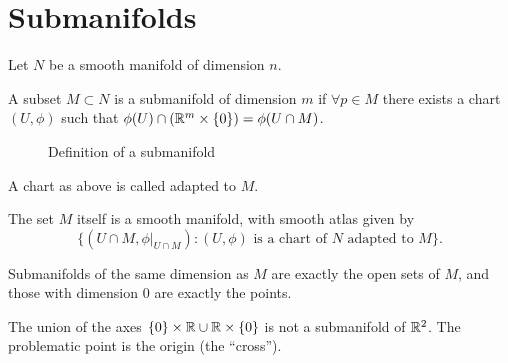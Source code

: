 \section{Submanifolds}

Let $N$ be a smooth manifold of dimension $n$.
\begin{definition}[Submanifold]
    A subset $M \subset N$ is a submanifold of dimension $m$ if $\forall p \in M$ there exists a chart $(U,\phi)$ such that $\phi(U) \cap \left( \mathbb{R}^m  \times \{0\} \right)  = \phi(U \cap M)$.
\end{definition}

\begin{figure}[ht]
    \centering
    \caption{Definition of a submanifold}
    \label{fig:submanifold}
\end{figure}
\begin{remark}
    A chart as above is called adapted to $M$.
\end{remark}
\begin{remark}
    The set $M$ itself is a smooth manifold, with smooth atlas given by     \[
        \{(U \cap M, \phi|_{U \cap M}) : (U, \phi) \text{ is a chart of $N$ adapted to $M$}\} 
    .\] 
\end{remark}
\begin{remark}
   Submanifolds of the same dimension as $M$ are exactly the open sets of $M$, and those with dimension $0$ are exactly the points.
\end{remark}
\begin{eg}
 The union of the axes   $\{0\} \times \mathbb{R} \cup \mathbb{R}\times \{0\}$ is not a submanifold of $\mathbb{R}^2$. The problematic point is the origin (the ``cross'').
\end{eg}

